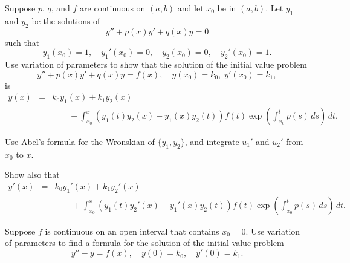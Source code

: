 \documentclass{ximera}
\begin{document}
\begin{problem}\label{exer:5.7.37}
Suppose $p$,  $q$, and $f$ are continuous
on $(a,b)$ and let $x_0$ be in $(a,b)$. Let
$y_1$ and $y_2$ be the  solutions of
$$
y''+p(x)y'+q(x)y=0
$$
such that
$$
y_1(x_0)=1, \quad y_1'(x_0)=0, \quad y_2(x_0)=0, \quad
y_2'(x_0)=1.
$$
Use variation of parameters to show that the solution of the initial
value problem
$$
y''+p(x)y'+q(x)y=f(x), \quad   y(x_0)=k_0,\;  y'(x_0)=k_1,
$$
is
$$
\begin{array}{rcl}
y(x) &=& k_0y_1(x)+k_1y_2(x) \\
& & \qquad+\int^x_{x_0}\left(y_1(t)y_2(x)-
y_1(x)y_2(t)\right)
f(t)\exp\left(\int^t_{x_0}p(s)\,ds\right)\,dt.
\end{array}
$$
\begin{hint}
Use Abel's formula for the Wronskian of $\{y_1,y_2\}$, and
integrate $u_1'$ and $u_2'$ from $x_0$ to $x$.
\end{hint}
Show also that
$$
\begin{array}{rcl}
y'(x) &=& k_0y_1'(x)+k_1y_2'(x) \\
& & \qquad+\int^x_{x_0}\left(y_1(t)y_2'(x)-y_1'(x)y_2(t)
\right)f(t)\exp\left(\int^t_{x_0}p(s)\,ds\right)\,dt.
\end{array}
$$
\end{problem}

\begin{problem}\label{exer:5.7.38}
Suppose $f$ is continuous on an open interval
that contains $x_0=0$.
Use variation of parameters to
find a formula for the solution of the initial value problem
$$
y''-y=f(x), \quad  y(0)=k_0,\quad y'(0)=k_1.
$$
\end{problem}
\end{document}
